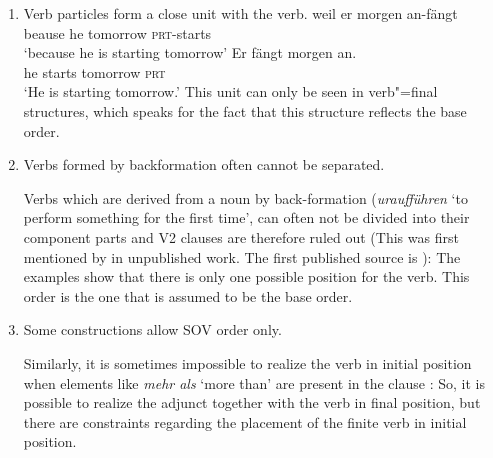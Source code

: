 \begin{enumerate}
\item Verb particles form a close unit with the verb.
\eal
\ex 
\gll weil er morgen an-fängt\\
	 beause he tomorrow \textsc{prt}-starts\\
\glt `because he is starting tomorrow'
\ex 
\gll Er fängt morgen an.\\
	 he starts tomorrow \textsc{prt}\\
\glt `He is starting tomorrow.'
\zl
This unit can only be seen in verb"=final structures, which speaks for the fact that this structure reflects the base order.

\item Verbs formed by backformation often cannot be separated.

Verbs which are derived from a noun by back-formation (\eg \emph{uraufführen} 
`to perform something for the first time', can often not be divided into their component parts and
V2 clauses are therefore ruled out (This was first mentioned by \citet{Hoehle91b} in unpublished
work. The first published source is ):
\eal
{}
\zl
The examples show that there is only one possible position for the verb. This order is the one that
is assumed to be the base order.

\item Some constructions allow SOV order only.

Similarly, it is sometimes impossible to realize the verb in initial position when elements like
\emph{mehr als} `more than' are present in the clause \citep{Haider97c,Meinunger2001a}: 
\eal
{}
\zl
So, it is possible to realize the adjunct together with the verb in final position, but there are
constraints regarding the placement of the finite verb in initial position.



\end{enumerate}
